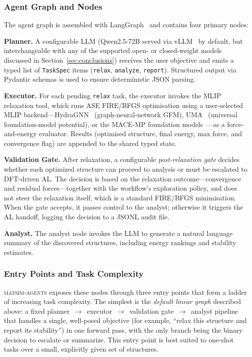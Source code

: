 \documentclass[conference]{IEEEtran}
\def\ac#1{#1}%
\def\acs#1{#1}%
\begin{document}
\subsubsection{Agent Graph and Nodes}
The agent graph is assembled with LangGraph~\cite{langgraph} and contains four
primary nodes:

\textbf{Planner.} A configurable \ac{LLM} (Qwen2.5-72B served via
vLLM~\cite{vllm} by default, but interchangeable with any of the supported
open- or closed-weight models discussed in Section~\ref{sec:conclusions})
receives the user objective and emits a typed list of
\texttt{TaskSpec} items (\texttt{relax}, \texttt{analyze}, \texttt{report}).
Structured output via Pydantic schemas is used to ensure deterministic \acs{JSON}
parsing.

\textbf{Executor.} For each pending \texttt{relax} task, the executor invokes
the \acs{MLIP} relaxation tool, which runs \ac{ASE} \acs{FIRE}/\acs{BFGS}
optimisation using a user-selected \acs{MLIP} backend---HydraGNN~\cite{hydragnn}
(graph-neural-network \acs{GFM}), UMA~\cite{wood2025uma} (universal
foundation-model potential), or the MACE-MP foundation
models~\cite{batatia2022,batatia2023macemp}---as a
force-and-energy evaluator. Results
(optimised structure, final energy, max force, and convergence flag) are
appended to the shared typed state.

\textbf{Validation Gate.} After relaxation, a configurable
\emph{post-relaxation gate} decides whether each optimized structure can proceed
to analysis or must be escalated to \acs{DFT}-driven \acs{AL}. The
decision is based on the relaxation outcome---convergence and residual
forces---together with the workflow's exploration policy, and does not steer the
relaxation itself, which is a standard \acs{FIRE}/\acs{BFGS} minimisation. When
the gate accepts, it passes control to the analyst; otherwise it triggers the
\acs{AL} handoff, logging the decision to a \ac{JSONL} audit file.

\textbf{Analyst.} The analyst node invokes the \acs{LLM} to generate a natural
language summary of the discovered structures, including energy rankings
and stability estimates.

\subsubsection{Entry Points and Task Complexity}
\textsc{matsim-agents} exposes these nodes through three entry points that form
a ladder of increasing task complexity. The simplest is the \emph{default
linear graph} described above: a fixed planner~$\rightarrow$~executor~$\rightarrow$~validation
gate~$\rightarrow$~analyst pipeline that handles a single, well-posed objective
(for example, ``relax this structure and report its stability'') in one
forward pass, with the only branch being the binary decision to escalate
or summarize. This entry point is best suited to one-shot tasks over a small,
explicitly given set of structures.
\end{document}
